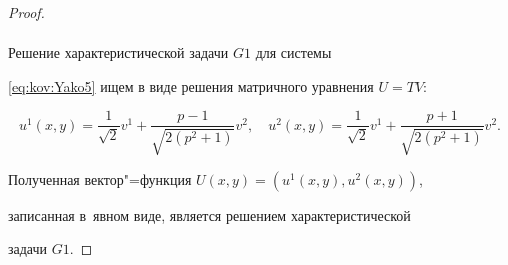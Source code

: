\begin{proof}
\begin{multline*}
\end{multline*}



Решение характеристической задачи $G1$ для системы

 \eqref{eq:kov:Yako5} ищем в виде решения матричного уравнения $U=TV$:

$$

u^{1}(x,y)=\frac{1}{\sqrt{2}}v^{1}+\frac{p-1}{\sqrt{2(p^{2}+1)}}v^{2},\quad 

u^{2}(x,y)=\frac{1}{\sqrt{2}}v^{1}+\frac{p+1}{\sqrt{2(p^{2}+1)}}v^{2}.

$$



Полученная вектор"=функция $U(x,y)=(u^{1}(x,y),u^{2}(x,y))$,

записанная в~явном виде, является решением характеристической

задачи $G1$.\end{proof}



